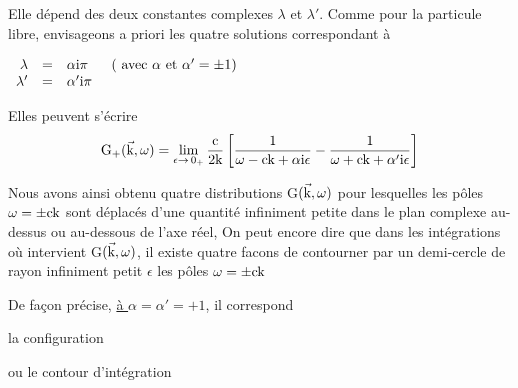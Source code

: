 Elle dépend des deux constantes complexes $\lambda$ et $\lambda'$. Comme pour la particule
libre, envisageons a priori les quatre solutions correspondant à
\begin{center}
$\begin{array}{r c l}
\lambda & = & \alpha\text{i}\pi \ \ \ \ \ (\text{ avec }\alpha\text{ et }\alpha'=\pm1)\\
\lambda' & = & \alpha'\text{i}\pi
\end{array}$
\end{center}
Elles peuvent s'écrire
\[
\text{G}_+(\vec{\text{k}},\omega)=\lim_{\epsilon\to\,0_+}
\frac{\text{c}}{2\text{k}}\left[\frac{1}{\omega-\text{ck}+\alpha\text{i}\epsilon}-\frac{1}{\omega+\text{ck}+\alpha'\text{i}\epsilon}\right]
\]

Nous avons ainsi obtenu quatre distributions G$(\vec{\text{k}},\omega)$ pour lesquelles les
pôles $\omega=\pm\text{ck}$ sont déplacés d'une quantité infiniment petite dans le
plan complexe au-dessus ou au-dessous de l'axe réel, On peut encore dire
que dans les intégrations où intervient G$(\vec{\text{k}},\omega)$, il existe quatre facons
de contourner par un demi-cercle de rayon infiniment petit $\epsilon$ les pôles $\omega=\pm\text{ck}$

De façon précise,
\ul{à $\alpha=\alpha'=+1$}, il correspond %

\vspace{0.3cm}
\begin{minipage}[c]{.45\linewidth} \begin{center}
la configuration

 \end{center} \end{minipage}
\hfill
\begin{minipage}[c]{.45\linewidth} \begin{center}
ou le contour d'intégration \vspace{0.3cm}

 \end{center} \end{minipage}
\vspace{0.3cm}

